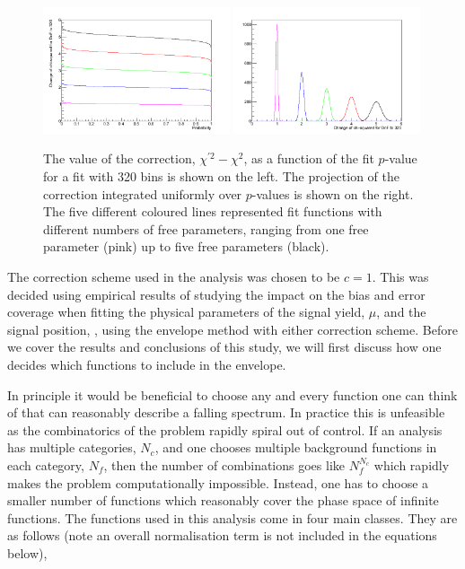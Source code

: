 \begin{figure}
  \begin{center}
    \includegraphics[width=0.49\textwidth]{analysis/plots/ChisqConv1.png}
    \includegraphics[width=0.49\textwidth]{analysis/plots/ChisqConv2.png}
    \caption[An estimation of the correction required in the envelope method]{The value of the correction, $\chi^{\prime 2} - \chi^{2}$, as a function of the fit $p$-value for a fit with 320 bins is shown on the left. The projection of the correction integrated uniformly over $p$-values is shown on the right. The five different coloured lines represented fit functions with different numbers of free parameters, ranging from one free parameter (pink) up to five free parameters (black).}
    \label{fig:envelope_chi2_correction}
  \end{center}
\end{figure}
The correction scheme used in the analysis was chosen to be $c=1$. This was decided using empirical results of studying the impact on the bias and error coverage when fitting the physical parameters of the signal yield, $\mu$, and the signal position, \mH, using the envelope method with either correction scheme. Before we cover the results and conclusions of this study, we will first discuss how one decides which functions to include in the envelope.

In principle it would be beneficial to choose any and every function one can think of that can reasonably describe a falling spectrum. In practice this is unfeasible as the combinatorics of the problem rapidly spiral out of control. If an analysis has multiple categories, $N_{c}$, and one chooses multiple background functions in each category, $N_{f}$, then the number of combinations goes like $N_{f}^{N_{c}}$ which rapidly makes the problem computationally impossible. Instead, one has to choose a smaller number of functions which reasonably cover the phase space of infinite functions. The functions used in this analysis come in four main classes. They are as follows (note an overall normalisation term is not included in the equations below),


